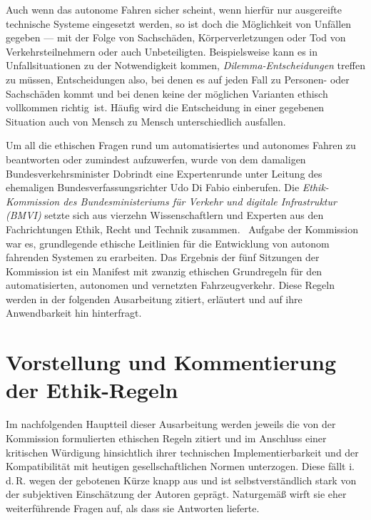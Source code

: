 \documentclass[twoside,a4paper,12pt]{article}
\begin{document}
Auch wenn das autonome Fahren sicher scheint, wenn hierfür nur ausgereifte technische Systeme eingesetzt werden, so ist doch die Möglichkeit von Unfällen gegeben ---
mit der Folge von Sachschäden, Körperverletzungen oder Tod von Verkehrsteilnehmern oder auch Unbeteiligten. Beispielsweise kann es in Unfallsituationen zu der
Notwendigkeit kommen, \textit{Dilemma-Entscheidungen} treffen zu müssen, Entscheidungen also, bei denen es auf jeden Fall zu Personen- oder Sachschäden kommt
und bei denen keine der möglichen Varianten ethisch vollkommen \glqq richtig\grqq\ ist. Häufig wird die Entscheidung in einer gegebenen Situation auch von Mensch zu
Mensch unterschiedlich ausfallen. 

Um all die ethischen Fragen rund um automatisiertes und autonomes Fahren zu beantworten oder zumindest aufzuwerfen, wurde von dem damaligen Bundesverkehrsminister Dobrindt eine Expertenrunde unter Leitung des ehemaligen Bundesverfassungsrichter Udo Di Fabio einberufen. Die \textit{Ethik-Kommission
des Bundesministeriums für Verkehr und digitale Infrastruktur (BMVI)} setzte sich aus vierzehn Wissenschaftlern und Experten aus den Fachrichtungen Ethik, Recht und Technik zusammen.~\cite{bmvi1} Aufgabe der Kommission war es, grundlegende ethische Leitlinien für die Entwicklung von autonom fahrenden Systemen zu
erarbeiten. Das Ergebnis der fünf Sitzungen der Kommission ist ein Manifest mit zwanzig ethischen Grundregeln für den automatisierten, autonomen und vernetzten Fahrzeugverkehr. Diese Regeln werden in der folgenden Ausarbeitung zitiert, erläutert und auf ihre Anwendbarkeit hin hinterfragt. 

\newpage






\section{Vorstellung und Kommentierung der Ethik-Regeln} \label{VorstellungUndKommentierungDerEthikRegeln}

Im nachfolgenden Hauptteil dieser Ausarbeitung werden jeweils die von der Kommission formulierten ethischen Regeln zitiert und im Anschluss einer kritischen 
Würdigung hinsichtlich ihrer technischen Implementierbarkeit und der Kompatibilität mit heutigen gesellschaftlichen Normen unterzogen. 
Diese fällt i.\,d.\,R. wegen der gebotenen Kürze knapp aus und ist selbstverständlich
stark von der subjektiven Einschätzung der Autoren geprägt. Naturgemäß wirft sie eher weiterführende Fragen auf, als dass sie Antworten lieferte.\\
\end{document}
